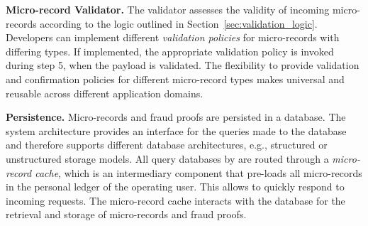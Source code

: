 \textbf{Micro-record Validator.}
The validator assesses the validity of incoming micro-records according to the logic outlined in Section~\ref{sec:validation_logic}.
Developers can implement different \emph{validation policies} for micro-records with differing types.
If implemented, the appropriate validation policy is invoked during step 5, when the payload is validated.
The flexibility to provide validation and confirmation policies for different micro-record types makes \ModelName{} universal and reusable across different application domains.



\textbf{Persistence.}
Micro-records and fraud proofs are persisted in a database.
The \ModelName{} system architecture provides an interface for the queries made to the database and therefore supports different database architectures, e.g., structured or unstructured storage models.
All query databases by \ModelName{} are routed through a \emph{micro-record cache}, which is an intermediary component that pre-loads all micro-records in the personal ledger of the operating user.
This allows \ModelName{} to quickly respond to incoming requests.
The micro-record cache interacts with the database for the retrieval and storage of micro-records and fraud proofs.

